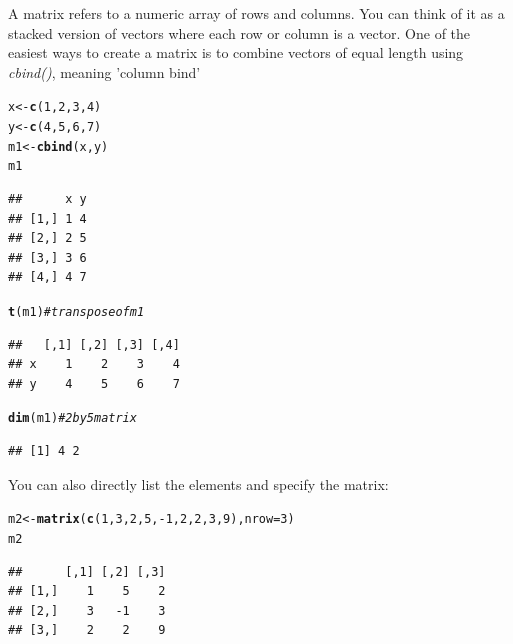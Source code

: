 \documentclass[english,nohyper]{tufte-book}\usepackage[]{graphicx}\usepackage[]{color}
\makeatletter
\newcommand{\hlnum}[1]{\textcolor[rgb]{0.686,0.059,0.569}{#1}}%
\newcommand{\hlcom}[1]{\textcolor[rgb]{0.678,0.584,0.686}{\textit{#1}}}%
\newcommand{\hlopt}[1]{\textcolor[rgb]{0,0,0}{#1}}%
\newcommand{\hlstd}[1]{\textcolor[rgb]{0.345,0.345,0.345}{#1}}%
\newcommand{\hlkwb}[1]{\textcolor[rgb]{0.69,0.353,0.396}{#1}}%
\newcommand{\hlkwc}[1]{\textcolor[rgb]{0.333,0.667,0.333}{#1}}%
\newcommand{\hlkwd}[1]{\textcolor[rgb]{0.737,0.353,0.396}{\textbf{#1}}}%
\newenvironment{kframe}{%
 \def\at@end@of@kframe{}%
 \ifinner\ifhmode%
  \def\at@end@of@kframe{\end{minipage}}%
  \begin{minipage}{\columnwidth}%
 \fi\fi%
 \def\FrameCommand##1{\hskip\@totalleftmargin \hskip-\fboxsep
 \colorbox{shadecolor}{##1}\hskip-\fboxsep
     \hskip-\linewidth \hskip-\@totalleftmargin \hskip\columnwidth}%
 \MakeFramed {\advance\hsize-\width
   \@totalleftmargin\z@ \linewidth\hsize
   \@setminipage}}%
 {\par\unskip\endMakeFramed%
 \at@end@of@kframe}
\newenvironment{knitrout}{}{} %
\makeatother
\begin{document}
A matrix refers to a numeric array of rows and columns. You can think
of it as a stacked version of vectors where each row or column is
a vector. One of the easiest ways to create a matrix is to combine
vectors of equal length using \emph{cbind()}, meaning 'column bind'

\begin{knitrout}
\color{fgcolor}\begin{kframe}
\begin{alltt}
\hlstd{x} \hlkwb{<-} \hlkwd{c}\hlstd{(}\hlnum{1}\hlstd{,} \hlnum{2}\hlstd{,} \hlnum{3}\hlstd{,} \hlnum{4}\hlstd{)}
\hlstd{y} \hlkwb{<-} \hlkwd{c}\hlstd{(}\hlnum{4}\hlstd{,} \hlnum{5}\hlstd{,} \hlnum{6}\hlstd{,} \hlnum{7}\hlstd{)}
\hlstd{m1} \hlkwb{<-} \hlkwd{cbind}\hlstd{(x, y)}
\hlstd{m1}
\end{alltt}
\begin{verbatim}
##      x y
## [1,] 1 4
## [2,] 2 5
## [3,] 3 6
## [4,] 4 7
\end{verbatim}
\begin{alltt}
\hlkwd{t}\hlstd{(m1)}  \hlcom{# transpose of m1}
\end{alltt}
\begin{verbatim}
##   [,1] [,2] [,3] [,4]
## x    1    2    3    4
## y    4    5    6    7
\end{verbatim}
\begin{alltt}
\hlkwd{dim}\hlstd{(m1)}  \hlcom{# 2 by 5 matrix }
\end{alltt}
\begin{verbatim}
## [1] 4 2
\end{verbatim}
\end{kframe}
\end{knitrout}


You can also directly list the elements and specify the matrix:

\begin{knitrout}
\color{fgcolor}\begin{kframe}
\begin{alltt}
\hlstd{m2} \hlkwb{<-} \hlkwd{matrix}\hlstd{(}\hlkwd{c}\hlstd{(}\hlnum{1}\hlstd{,} \hlnum{3}\hlstd{,} \hlnum{2}\hlstd{,} \hlnum{5}\hlstd{,} \hlopt{-}\hlnum{1}\hlstd{,} \hlnum{2}\hlstd{,} \hlnum{2}\hlstd{,} \hlnum{3}\hlstd{,} \hlnum{9}\hlstd{),} \hlkwc{nrow} \hlstd{=} \hlnum{3}\hlstd{)}
\hlstd{m2}
\end{alltt}
\begin{verbatim}
##      [,1] [,2] [,3]
## [1,]    1    5    2
## [2,]    3   -1    3
## [3,]    2    2    9
\end{verbatim}
\end{kframe}
\end{knitrout}
\end{document}
